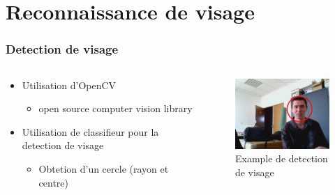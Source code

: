 \section{Reconnaissance de visage}
\begin{frame}
  \frametitle{Detection de visage}
  \begin{columns}[c]
    \begin{column}[T]{.5\textwidth}
      \begin{itemize}
        \item Utilisation d'OpenCV
          \begin{itemize}
            \item open source computer vision library
          \end{itemize}
        \item Utilisation de classifieur pour la detection de visage
          \begin{itemize}
            \item Obtetion d'un cercle (rayon et centre)
          \end{itemize}
      \end{itemize}
    \end{column}
    \begin{column}[T]{.5\textwidth}
      \begin{figure}
        \begin{center}
          \includegraphics[width=5cm]{image/faceDetection.png}
          \caption{Example de detection de visage}
        \end{center}
      \end{figure}
    \end{column}
  \end{columns}   
\end{frame}

\begin{frame}
  \frametitle{}
\end{frame}

